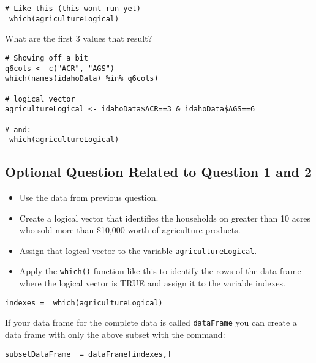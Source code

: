 \documentclass[]{article}
\begin{document}
\begin{framed} 
\begin{verbatim}
# Like this (this wont run yet)
 which(agricultureLogical) 
\end{verbatim}
\end{framed} 

What are the first 3 values that result?

\begin{framed} \begin{verbatim}
# Showing off a bit
q6cols <- c("ACR", "AGS")
which(names(idahoData) %in% q6cols)  

# logical vector
agricultureLogical <- idahoData$ACR==3 & idahoData$AGS==6

# and:
 which(agricultureLogical) 
\end{verbatim}\end{framed} 


\newpage
\subsection*{Optional Question Related to Question 1 and 2}

\begin{itemize}
\item Use the data from previous question. 
\item Create a logical vector that identifies the households on greater than 10 acres who
 sold more than \$10,000 worth of agriculture products. 
\item Assign that logical vector to the variable \texttt{agricultureLogical}. 
\item Apply the \texttt{which()} function like this to identify the rows of the 
data frame where the logical vector is TRUE and assign it to the variable indexes. 
\end{itemize}

\begin{framed} \begin{verbatim}
indexes =  which(agricultureLogical) 
\end{verbatim}\end{framed} 

If your data frame for the complete data is called \texttt{dataFrame} you can create a data frame 
with only the above subset with the command: 

\begin{framed} 
\begin{verbatim}
subsetDataFrame  = dataFrame[indexes,] 
\end{verbatim}
\end{framed} 
\end{document}
